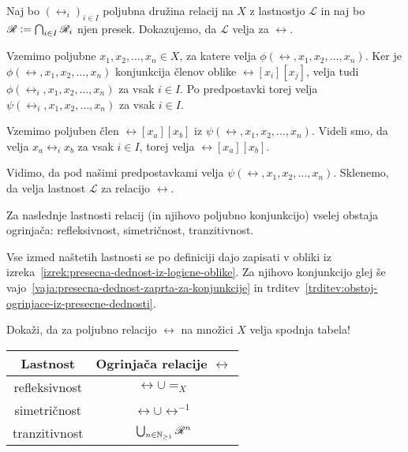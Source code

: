                \begin{dokaz}
                        Naj bo $(\rel_i)_{i \in I}$ poljubna družina relacij na $X$ z lastnostjo $\mathscr{L}$ in naj bo $\rel \dfeq \bigcap_{i \in I} \rel_i$ njen presek. Dokazujemo, da $\mathscr{L}$ velja za $\rel$.

                        Vzemimo poljubne $x_1, x_2, \ldots, x_n \in X$, za katere velja $\phi(\rel, x_1, x_2, \ldots, x_n)$. Ker je $\phi(\rel, x_1, x_2, \ldots, x_n)$ konjunkcija členov oblike $\rel[x_i][x_j]$, velja tudi $\phi(\rel_i, x_1, x_2, \ldots, x_n)$ za vsak $i \in I$. Po predpostavki torej velja $\psi(\rel_i, x_1, x_2, \ldots, x_n)$ za vsak $i \in I$.

                        Vzemimo poljuben člen $\rel[x_a][x_b]$ iz $\psi(\rel, x_1, x_2, \ldots, x_n)$. Videli smo, da velja $x_a \mathrel{\rel_i} x_b$ za vsak $i \in I$, torej velja $\rel[x_a][x_b]$.

                        Vidimo, da pod našimi predpostavkami velja $\psi(\rel, x_1, x_2, \ldots, x_n)$. Sklenemo, da velja lastnost $\mathscr{L}$ za relacijo $\rel$.
                \end{dokaz}

                \begin{posledica}\label{posledica:obstoj-ogrinjac}
                        Za naslednje lastnosti relacij (in njihovo poljubno konjunkcijo) vselej obstaja ogrinjača: refleksivnost, simetričnost, tranzitivnost.
                \end{posledica}

                \begin{dokaz}
                        Vse izmed naštetih lastnosti se po definiciji dajo zapisati v obliki iz izreka~\ref{izrek:presecna-dednost-iz-logicne-oblike}. Za njihovo konjunkcijo glej še vajo~\ref{vaja:presecna-dednost-zaprta-za-konjunkcije} in trditev~\ref{trditev:obstoj-ogrinjace-iz-presecne-dednosti}.
                \end{dokaz}

                \begin{vaja}
                        Dokaži, da za poljubno relacijo $\rel$ na množici $X$ velja spodnja tabela!
                        \begin{center}
                                \begin{tabular}{|c|c|}
                                        \hline
                                        \textbf{Lastnost} & \textbf{Ogrinjača relacije $\rel$} \\
                                        \hline
                                        refleksivnost & $\rel \cup =_X$ \\
                                        simetričnost & $\rel \cup \rel^{-1}$ \\
                                        tranzitivnost & $\bigcup_{n \in \NN_{\geq 1}} \rel^n$ \\
                                        \hline
                                \end{tabular}
                        \end{center}
                \end{vaja}

